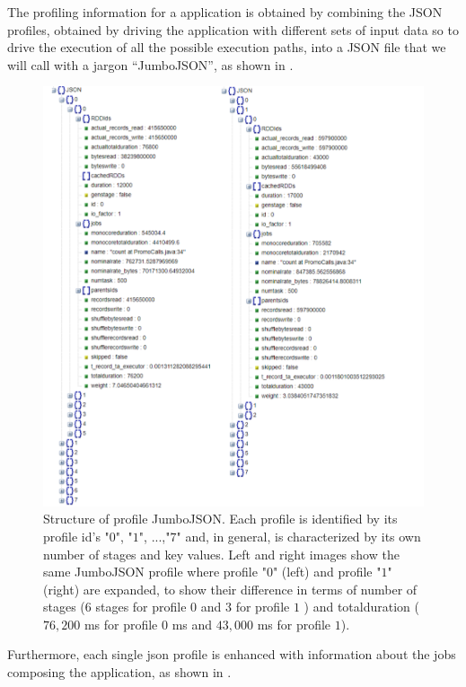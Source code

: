 The profiling information for a \tool application is obtained by combining the JSON profiles, obtained by driving the application with different sets of input data so to drive the execution of all the possible execution paths, into a JSON file that we will call with a jargon “JumboJSON”, as shown in .
\begin{figure}[tbhp]
	\hspace*{-2cm}
	\centering
	\includegraphics[width=18cm]{images/xsparksymb_profile_structure}
	\caption{Structure of profile JumboJSON. Each profile is identified by its profile id's {"$0$", "$1$", ...,"$7$"} and, in general, is characterized by its own number of stages and key values. Left and right images show the same JumboJSON profile where profile "$0$" (left) and profile "$1$" (right) are expanded, to show their difference in terms of number of stages ($6$ stages for profile $0$ and $3$ for profile $1$ ) and totalduration ($76,200$ ms for profile $0$ ms and  $43,000$ ms for profile $1$).}
	\label{fig:jumboJSON_structure}
\end{figure}
Furthermore, each single json profile is enhanced with information about the jobs composing the application, as shown in . 
